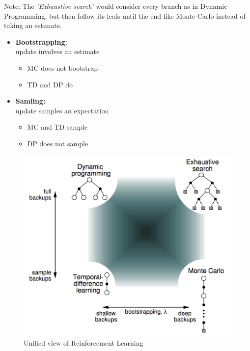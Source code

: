 \documentclass[10pt]{article}
\begin{document}
\begin{center}
\begin{minipage}[t]{0.45\textwidth}
Note: The \textit{'Exhaustive search'} would consider every branch as in Dynamic Programming, but then follow its leafs until the end like Monte-Carlo instead of taking an estimate.
\end{minipage} \hfill
\begin{minipage}[t]{0.4\textwidth}
\begin{itemize}
\item \textbf{Bootstrapping:} \\ update involves an estimate
\begin{itemize}
\item MC does not bootstrap
\item TD and DP do
\end{itemize}
\item \textbf{Samling:} \\ update samples an expectation
\begin{itemize}
\item MC and TD sample
\item DP does not sample
\end{itemize}
\end{itemize}
\end{minipage}
\end{center}
\newpage
\begin{figure}
\includegraphics[scale=0.12]{pictures/unified_view.jpg}
\caption{Unified view of Reinforcement Learning}
\end{figure}
\end{document}
